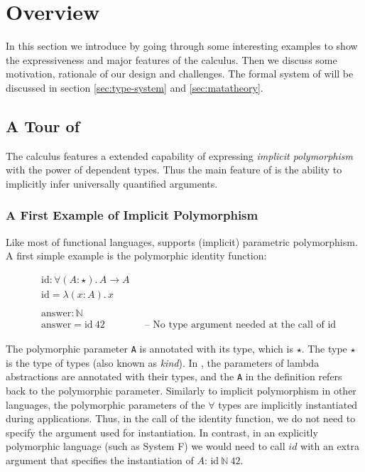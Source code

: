 \section{Overview}

In this section we introduce \name by going through
some interesting examples to show the expressiveness and major features of the calculus.
Then we discuss some motivation, rationale of our design and challenges.
The formal system of \name will be
discussed in section \ref{sec:type-system} and \ref{sec:matatheory}.

\subsection{A Tour of \name}
\label{sec:examples}

The \name calculus features a extended capability of expressing \emph{implicit
  polymorphism} with the power of dependent types. Thus the main feature of \name
is the ability to implicitly infer universally quantified arguments.

\subsubsection{A First Example of Implicit Polymorphism}
Like most of functional languages, \name supports (implicit) parametric polymorphism.
A first simple example is the polymorphic identity
function:

\begin{align*}
&\mathrm{id} : \forall (A : \star).\, A \rightarrow A \\
&\mathrm{id} = \lambda (x : A).\, x \\
\\
&\mathrm{answer} : \mathbb{N} \\
&\mathrm{answer} = \mathrm{id} ~ 42  \quad\quad\quad\quad    \text{-- No type argument needed at the call of $\mathrm{id}$}
\end{align*}

\noindent The polymorphic parameter \verb|A| is annotated with its type,
which is $\star$. The type $\star$ is the type of types (also known as
\emph{kind}). In \name, the parameters of lambda abstractions are annotated
with their types, and the \verb|A| in the definition refers back to the
polymorphic parameter. Similarly to implicit polymorphism in other languages,
the polymorphic parameters of the $\forall$ types are implicitly instantiated
during applications. Thus, in the call of the identity function, we
do not need to specify the argument used for instantiation. In contrast,
in an explicitly polymorphic language (such as System F) we would need
to call $id$ with an extra argument that specifies the instantiation of $A$:
$\mathrm{id}~\mathbb{N}~ 42$.


